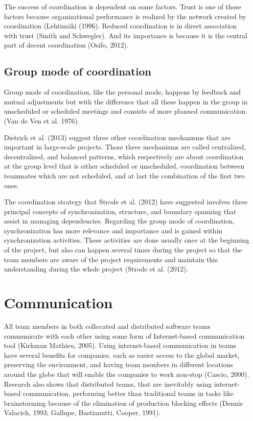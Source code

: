 The success of coordination is dependent on some factors. Trust is one of those factors because organizational performance is realized by the network created by coordination (Lehtimäki (1996). Reduced coordination is in direct association with trust (Smith and Schwegler). And its importance is because it is the central part of decent coordination (Osifo, 2012). 

\subsection{Group mode of coordination}
Group mode of coordination, like the personal mode, happens by feedback and mutual adjustments but with the difference that all these happen in the group in unscheduled or scheduled meetings and consists of more planned communication  (Van de Ven et al. 1976).

Dietrich et al. (2013) suggest three other coordination mechanisms that are important in large-scale projects. Those three mechanisms are called centralized, decentralized, and balanced patterns, which respectively are about coordination at the group level that is either scheduled or unscheduled, coordination between teammates which are not scheduled, and at last the combination of the first two ones.

The coordination strategy that Strode et al. (2012) have suggested involves three principal concepts of synchronization, structure, and boundary spanning that assist in managing dependencies. Regarding the group mode of coordination, synchronization has more relevance and importance and is gained within synchronization activities. These activities are done usually once at the beginning of the project, but also can happen several times during the project so that the team members are aware of the project requirements and maintain this understanding during the whole project (Strode et al. (2012). 

\section{Communication} \label{communication}
All team members in both collocated and distributed software teams communicate with each other using some form of Internet-based communication tool (Kirkman  Mathieu, 2005). Using internet-based communication in teams have several benefits for companies, such as easier access to the global market, preserving the environment, and having team members in different locations around the globe that will enable the companies to work non-stop (Cascio, 2000). Research also shows that distributed teams, that are inevitably using internet-based communication, performing better than traditional teams in tasks like brainstorming because of the elimination of production blocking effects (Dennis  Valacich, 1993; Gallupe, Bastianutti,  Cooper, 1991).


